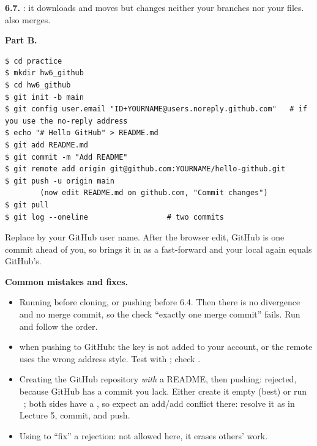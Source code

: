 \textbf{6.7.} : it downloads and moves  but changes neither your branches nor your files.  also merges.

\textbf{Part B.}

\begin{lstlisting}
$ cd practice
$ mkdir hw6_github
$ cd hw6_github
$ git init -b main
$ git config user.email "ID+YOURNAME@users.noreply.github.com"   # if you use the no-reply address
$ echo "# Hello GitHub" > README.md
$ git add README.md
$ git commit -m "Add README"
$ git remote add origin git@github.com:YOURNAME/hello-github.git
$ git push -u origin main
        (now edit README.md on github.com, "Commit changes")
$ git pull
$ git log --oneline                  # two commits
\end{lstlisting}

Replace  by your GitHub user name. After the browser edit, GitHub is one commit ahead of you, so  brings it in as a fast-forward and your local  again equals GitHub's.

\textbf{Common mistakes and fixes.}
\begin{itemize}
  \item Running  before cloning, or pushing before 6.4. Then there is no divergence and no merge commit, so the check ``exactly one merge commit'' fails. Run  and follow the order.
  \item {} when pushing to GitHub: the key is not added to your account, or the remote uses the wrong address style. Test with ; check .
  \item Creating the GitHub repository \emph{with} a README, then pushing: rejected, because GitHub has a commit you lack. Either create it empty (best) or run \allowbreak\ ; both sides have a , so expect an add/add conflict there: resolve it as in Lecture 5, commit, and push.
  \item Using  to ``fix'' a rejection: not allowed here, it erases others' work.
\end{itemize}
